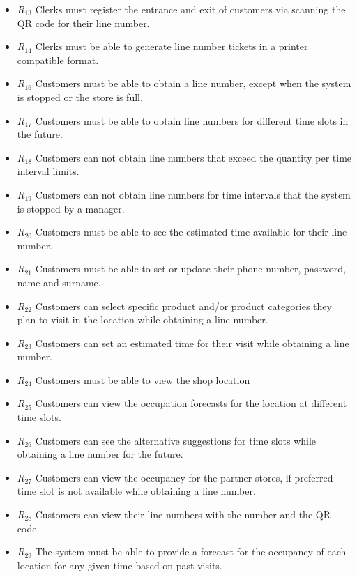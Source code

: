 \begin{itemize}
    \item \textbf{$R_{13}$} Clerks must register the entrance and exit of customers via scanning the QR code for their line number.
    \item \textbf{$R_{14}$} Clerks must be able to generate line number tickets in a printer compatible format.
    \item \textbf{$R_{16}$} Customers must be able to obtain a line number, except when the system is stopped or the store is full.
    \item \textbf{$R_{17}$} Customers must be able to obtain line numbers for different time slots in the future.
    \item \textbf{$R_{18}$} Customers can not obtain line numbers that exceed the quantity per time interval limits.
    \item \textbf{$R_{19}$} Customers can not obtain line numbers for time intervals that the system is stopped by a manager.
    \item \textbf{$R_{20}$} Customers must be able to see the estimated time available for their line number.
    \item \textbf{$R_{21}$} Customers must be able to set or update their phone number, password, name and surname. %
    \item \textbf{$R_{22}$} Customers can select specific product and/or product categories they plan to visit in the location while obtaining a line number.
    \item \textbf{$R_{23}$} Customers can set an estimated time for their visit while obtaining a line number.
    \item \textbf{$R_{24}$} Customers must be able to view the shop location
    \item \textbf{$R_{25}$} Customers can view the occupation forecasts for the location at different time slots.
    \item \textbf{$R_{26}$} Customers can see the alternative suggestions for time slots while obtaining a line number for the future.
    \item \textbf{$R_{27}$} Customers can view the occupancy for the partner stores, if preferred time slot is not available while obtaining a line number.
    \item \textbf{$R_{28}$} Customers can view their line numbers with the number and the QR code.
    \item \textbf{$R_{29}$} The system must be able to provide a forecast for the occupancy of each location for any given time based on past visits.
\end{itemize}

